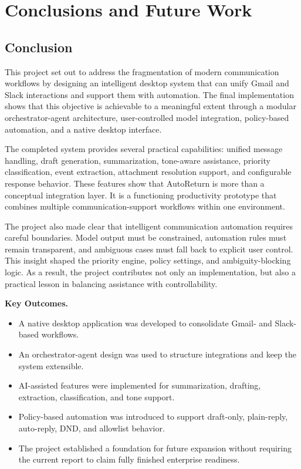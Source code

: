 \chapter{Conclusions and Future Work}
\label{sec:conclusions}

\section{Conclusion}
This project set out to address the fragmentation of modern communication workflows by designing an intelligent desktop system that can unify Gmail and Slack interactions and support them with automation. The final implementation shows that this objective is achievable to a meaningful extent through a modular orchestrator-agent architecture, user-controlled model integration, policy-based automation, and a native desktop interface.

The completed system provides several practical capabilities: unified message handling, draft generation, summarization, tone-aware assistance, priority classification, event extraction, attachment resolution support, and configurable response behavior. These features show that AutoReturn is more than a conceptual integration layer. It is a functioning productivity prototype that combines multiple communication-support workflows within one environment.

The project also made clear that intelligent communication automation requires careful boundaries. Model output must be constrained, automation rules must remain transparent, and ambiguous cases must fall back to explicit user control. This insight shaped the priority engine, policy settings, and ambiguity-blocking logic. As a result, the project contributes not only an implementation, but also a practical lesson in balancing assistance with controllability.

\textbf{Key Outcomes.}
\begin{itemize}
    \item A native desktop application was developed to consolidate Gmail- and Slack-based workflows.
    \item An orchestrator-agent design was used to structure integrations and keep the system extensible.
    \item AI-assisted features were implemented for summarization, drafting, extraction, classification, and tone support.
    \item Policy-based automation was introduced to support draft-only, plain-reply, auto-reply, DND, and allowlist behavior.
    \item The project established a foundation for future expansion without requiring the current report to claim fully finished enterprise readiness.
\end{itemize}

